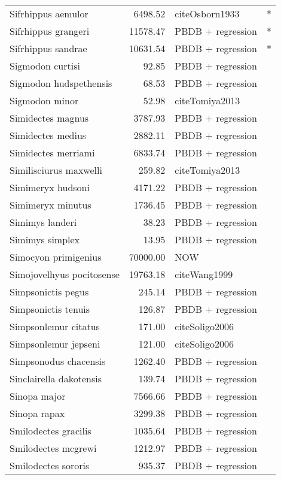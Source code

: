 \begin{table}[ht]
\begin{tabular}{lrll}
  Sifrhippus aemulor & 6498.52 & cite{Osborn1933} & * \\ 
  Sifrhippus grangeri & 11578.47 & PBDB + regression & * \\ 
  Sifrhippus sandrae & 10631.54 & PBDB + regression & * \\ 
  Sigmodon curtisi & 92.85 & PBDB + regression &  \\ 
  Sigmodon hudspethensis & 68.53 & PBDB + regression &  \\ 
  Sigmodon minor & 52.98 & cite{Tomiya2013} &  \\ 
  Simidectes magnus & 3787.93 & PBDB + regression &  \\ 
  Simidectes medius & 2882.11 & PBDB + regression &  \\ 
  Simidectes merriami & 6833.74 & PBDB + regression &  \\ 
  Similisciurus maxwelli & 259.82 & cite{Tomiya2013} &  \\ 
  Simimeryx hudsoni & 4171.22 & PBDB + regression &  \\ 
  Simimeryx minutus & 1736.45 & PBDB + regression &  \\ 
  Simimys landeri & 38.23 & PBDB + regression &  \\ 
  Simimys simplex & 13.95 & PBDB + regression &  \\ 
  Simocyon primigenius & 70000.00 & NOW &  \\ 
  Simojovelhyus pocitosense & 19763.18 & cite{Wang1999} &  \\ 
  Simpsonictis pegus & 245.14 & PBDB + regression &  \\ 
  Simpsonictis tenuis & 126.87 & PBDB + regression &  \\ 
  Simpsonlemur citatus & 171.00 & cite{Soligo2006} &  \\ 
  Simpsonlemur jepseni & 121.00 & cite{Soligo2006} &  \\ 
  Simpsonodus chacensis & 1262.40 & PBDB + regression &  \\ 
  Sinclairella dakotensis & 139.74 & PBDB + regression &  \\ 
  Sinopa major & 7566.66 & PBDB + regression &  \\ 
  Sinopa rapax & 3299.38 & PBDB + regression &  \\ 
  Smilodectes gracilis & 1035.64 & PBDB + regression &  \\ 
  Smilodectes mcgrewi & 1212.97 & PBDB + regression &  \\ 
  Smilodectes sororis & 935.37 & PBDB + regression &  \\ 

\end{tabular}
\end{table}
